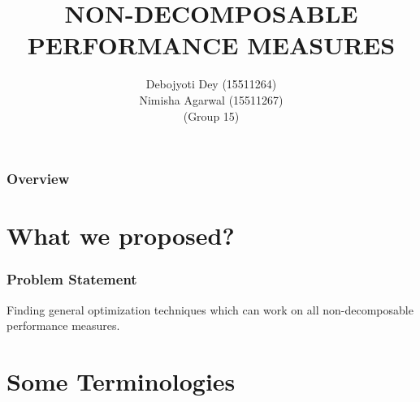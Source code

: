 \documentclass{beamer}
\title[Short title]{NON-DECOMPOSABLE PERFORMANCE MEASURES} %
\author{Debojyoti Dey (15511264)\\ Nimisha Agarwal (15511267)\\ (Group 15)} %
\begin{document}
	
	\begin{frame}
		\titlepage %
	\end{frame}
	
	\begin{frame}
		\frametitle{Overview} %
		\tableofcontents %
	\end{frame}


\section{What we proposed?} %

\begin{frame}
	\frametitle{Problem Statement}
	Finding general optimization techniques which can work on all non-decomposable performance measures.
\end{frame}


\section{Some Terminologies} %
\end{document}
